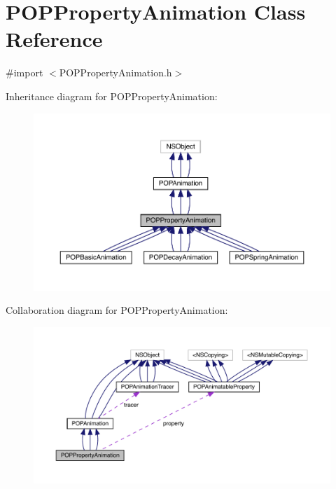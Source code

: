 \hypertarget{interface_p_o_p_property_animation}{}\section{P\+O\+P\+Property\+Animation Class Reference}
\label{interface_p_o_p_property_animation}


{\ttfamily \#import $<$P\+O\+P\+Property\+Animation.\+h$>$}



Inheritance diagram for P\+O\+P\+Property\+Animation\+:\nopagebreak
\begin{figure}[H]
\begin{center}
\leavevmode
\includegraphics[width=350pt]{interface_p_o_p_property_animation__inherit__graph}
\end{center}
\end{figure}


Collaboration diagram for P\+O\+P\+Property\+Animation\+:\nopagebreak
\begin{figure}[H]
\begin{center}
\leavevmode
\includegraphics[width=350pt]{interface_p_o_p_property_animation__coll__graph}
\end{center}
\end{figure}
